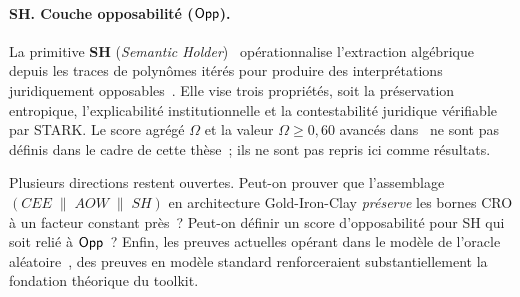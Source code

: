 \begin{sloppypar}
\paragraph{SH. Couche opposabilit\'e ($\mathsf{Opp}$).}
La primitive \textbf{SH} (\textit{Semantic Holder})~\cite{MINKA2025SH}
op\'erationnalise l'extraction alg\'ebrique depuis les traces de polyn\^omes
it\'er\'es pour produire des interpr\'etations juridiquement
opposables~\cite{Kerr04,Casey11}. Elle vise trois propri\'et\'es, soit la
pr\'eservation entropique, l'explicabilit\'e institutionnelle et la contestabilit\'e
juridique v\'erifiable par STARK. Le score agr\'eg\'e $\Omega$ et la valeur
$\Omega \geq 0{,}60$ avanc\'es dans~\cite{MINKA2025SH} ne sont pas d\'efinis dans le
cadre de cette th\`ese~; ils ne sont pas repris ici comme r\'esultats.

Plusieurs directions restent ouvertes. Peut-on prouver que l'assemblage
$(CEE \;\|\; AOW \;\|\; SH)$ en architecture Gold-Iron-Clay \emph{pr\'eserve}
les bornes CRO \`a un facteur constant pr\`es~? Peut-on d\'efinir un score
d'opposabilit\'e pour SH qui soit reli\'e \`a $\mathsf{Opp}$~? Enfin, les preuves actuelles
op\'erant dans le mod\`ele de l'oracle al\'eatoire~\cite{Bellare1993,Canetti2004},
des preuves en mod\`ele standard renforceraient substantiellement la fondation
th\'eorique du toolkit.
\end{sloppypar}


